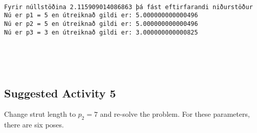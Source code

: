 \documentclass[11pt]{article}
\begin{document}
    \begin{center}
    \end{center}
    { \hspace*{\fill} \\}
    
    \begin{Verbatim}[commandchars=\\\{\}]
Fyrir núllstöðina 2.115909014086863 þá fást eftirfarandi niðurstöður
Nú er p1 = 5 en útreiknað gildi er: 5.000000000000496
Nú er p2 = 5 en útreiknað gildi er: 5.000000000000496
Nú er p3 = 3 en útreiknað gildi er: 3.000000000000825



    \end{Verbatim}

    \begin{center}
    \end{center}
    { \hspace*{\fill} \\}
    
    \subsection{Suggested Activity 5}\label{suggested-activity-5}

Change strut length to \(p_2 = 7\) and re-solve the problem. For these
parameters, there are six poses.
\end{document}
